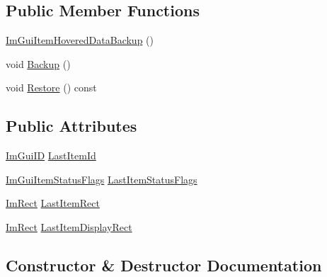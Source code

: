 \subsection*{Public Member Functions}
\begin{DoxyCompactItemize}
\item 
\mbox{\hyperlink{struct_im_gui_item_hovered_data_backup_a242a83a1258e1366ebfecce938c83604}{Im\+Gui\+Item\+Hovered\+Data\+Backup}} ()
\item 
void \mbox{\hyperlink{struct_im_gui_item_hovered_data_backup_a2084500d9cbc9455e52fbe87c95f2315}{Backup}} ()
\item 
void \mbox{\hyperlink{struct_im_gui_item_hovered_data_backup_ae812e9cff1c84c7b438a5af502d778f5}{Restore}} () const
\end{DoxyCompactItemize}
\subsection*{Public Attributes}
\begin{DoxyCompactItemize}
\item 
\mbox{\hyperlink{imgui_8h_a1785c9b6f4e16406764a85f32582236f}{Im\+Gui\+ID}} \mbox{\hyperlink{struct_im_gui_item_hovered_data_backup_a5e0b18013d983269deba7976666fc501}{Last\+Item\+Id}}
\item 
\mbox{\hyperlink{imgui__internal_8h_a86b8f9e2fd4084fb2112f003070b53fa}{Im\+Gui\+Item\+Status\+Flags}} \mbox{\hyperlink{struct_im_gui_item_hovered_data_backup_a7454f4ebf549581f0e70625a010786cf}{Last\+Item\+Status\+Flags}}
\item 
\mbox{\hyperlink{struct_im_rect}{Im\+Rect}} \mbox{\hyperlink{struct_im_gui_item_hovered_data_backup_ae489c222bed561950104a46ddf1387f3}{Last\+Item\+Rect}}
\item 
\mbox{\hyperlink{struct_im_rect}{Im\+Rect}} \mbox{\hyperlink{struct_im_gui_item_hovered_data_backup_a8bab24e0a70229e2f0cb1aae0d510252}{Last\+Item\+Display\+Rect}}
\end{DoxyCompactItemize}


\subsection{Constructor \& Destructor Documentation}
\mbox{\label{struct_im_gui_item_hovered_data_backup_a242a83a1258e1366ebfecce938c83604}} 
